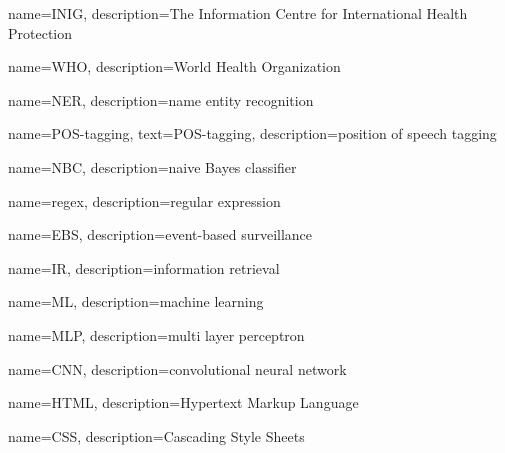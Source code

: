 {
  name={INIG},
  description={The Information Centre for International Health Protection}
}

{
  name={WHO},
  description={World Health Organization}
}

{
  name={NER},
  description={name entity recognition}
}

{
  name={POS-tagging},
  text={POS-tagging},
  description={position of speech tagging}
}

{
  name={NBC},
  description={naive Bayes classifier}
}

{
  name={regex},
  description={regular expression}
}

{
  name={EBS},
  description={event-based surveillance}
}

{
  name={IR},
  description={information retrieval}
}

{
  name={ML},
  description={machine learning}
}

{
  name={MLP},
  description={multi layer perceptron}
}

{
  name={CNN},
  description={convolutional neural network}
}

{
  name={HTML},
  description={Hypertext Markup Language}
}

{
  name={CSS},
  description={Cascading Style Sheets}
}
